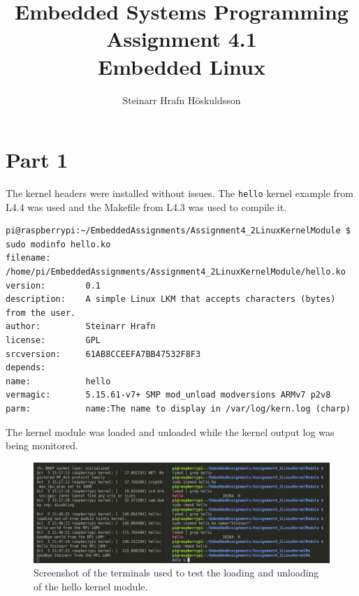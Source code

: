 \documentclass{article}
\title{Embedded Systems Programming \\ Assignment 4.1 \\ \large Embedded Linux}
\author{Steinarr Hrafn Höskuldsson}
\newcommand{\mycomment}[1]{}
\begin{document}
\pagestyle{firststyle}
{\let\newpage\relax\maketitle}

\mycomment{
\begin{figure}[h]
    \centering
    \texttt{[image: LAB3/Basic1.png]}
    \caption{"Switch test" Breadboard set up}
    \label{fig:Switch_test}
\end{figure}



}

\section*{Part 1}
The kernel headers were installed without issues. The \verb!hello! kernel example from L4.4 was used and the Makefile from L4.3 was used to compile it.

\begin{lstlisting}[caption={The output of modinfo}]
pi@raspberrypi:~/EmbeddedAssignments/Assignment4_2LinuxKernelModule $ sudo modinfo hello.ko
filename:       /home/pi/EmbeddedAssignments/Assignment4_2LinuxKernelModule/hello.ko
version:        0.1
description:    A simple Linux LKM that accepts characters (bytes) from the user.
author:         Steinarr Hrafn
license:        GPL
srcversion:     61AB8CCEEFA7BB47532F8F3
depends:        
name:           hello
vermagic:       5.15.61-v7+ SMP mod_unload modversions ARMv7 p2v8 
parm:           name:The name to display in /var/log/kern.log (charp)
\end{lstlisting}

The kernel module was loaded and unloaded while the kernel output log was being monitored. 
\begin{figure}[h]
    \centering
    \includegraphics[width=\textwidth]{Assignment4_2LinuxKernelModule/part1_kernel_loading.png}
    \caption{Screenshot of the terminals used to test the loading and unloading of the hello kernel module.}
    \label{fig:kernel_loading}
\end{figure}
\end{document}
